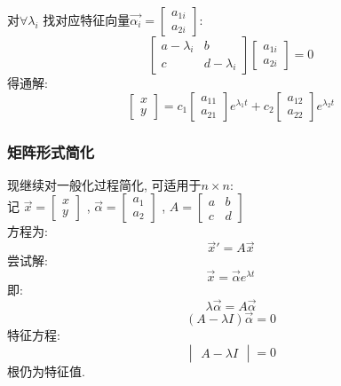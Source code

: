 对$\forall \lambda_i$ 找对应特征向量$\vec{\alpha _i}
=
\begin{bmatrix}
    a_{1i} \\
    a_{2i}
\end{bmatrix}$:
\[
\begin{bmatrix}
    a-\lambda_i & b \\
    c & d-\lambda_i
\end{bmatrix}
\begin{bmatrix}
    a_{1i} \\
    a_{2i}
\end{bmatrix}
= 0
\]
得通解:
\[
\begin{bmatrix}
    x \\
    y
\end{bmatrix}
=
c_1
\begin{bmatrix}
    a_{11} \\
    a_{21}
\end{bmatrix}
e^{\lambda_1 t}
+
c_2
\begin{bmatrix}
    a_{12} \\
    a_{22}
\end{bmatrix}
e^{\lambda_2 t}
\]

\subsubsection{\large 矩阵形式简化}
现继续对一般化过程简化, 可适用于$n \times n$:\\
记
$\vec{x} =
\begin{bmatrix}
    x \\
    y
\end{bmatrix}$ , 
$\vec{\alpha} =
\begin{bmatrix}
    a_1 \\
    a_2
\end{bmatrix}$ , 
$A =
\begin{bmatrix}
    a & b \\
    c & d
\end{bmatrix}$ \\
方程为:
\[
\vec{x}' = A \vec{x}
\]
尝试解:
\[
\vec{x}
=
\vec{\alpha}
e^{\lambda t}
\]
即:
\[ \lambda \vec{\alpha}= A \vec{\alpha} \]
\[ (A - \lambda I) \vec{\alpha} = 0 \]
特征方程:
\[
\begin{vmatrix}
    A - \lambda I
\end{vmatrix}
= 0
\]
根仍为特征值.

